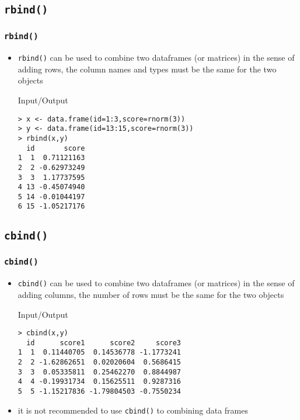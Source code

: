 \documentclass[xcolor={table},c]{beamer}
\begin{document}
\subsection{\texttt{rbind()}}
\begin{frame}[fragile]\frametitle{\texttt{rbind()}}
\begin{itemize}
\item \texttt{rbind()} can be used to combine two dataframes (or matrices) in the sense of adding rows, the column names and types must be the same for the two objects
  \begin{exampleblock}{Input/Output}\small
\begin{verbatim}
> x <- data.frame(id=1:3,score=rnorm(3))
> y <- data.frame(id=13:15,score=rnorm(3))
> rbind(x,y)
  id       score
1  1  0.71121163
2  2 -0.62973249
3  3  1.17737595
4 13 -0.45074940
5 14 -0.01044197
6 15 -1.05217176
\end{verbatim}
  \end{exampleblock}
\end{itemize}
\end{frame}

\subsection{\texttt{cbind()}}
\begin{frame}[fragile]\frametitle{\texttt{cbind()}}
\begin{itemize}
\item \texttt{cbind()} can be used to combine two dataframes (or matrices) in the sense of adding columns, the number of rows must be the same for the two objects
  \begin{exampleblock}{Input/Output}\small
\begin{verbatim}
> cbind(x,y)
  id      score1      score2     score3
1  1  0.11440705  0.14536778 -1.1773241
2  2 -1.62862651  0.02020604  0.5686415
3  3  0.05335811  0.25462270  0.8844987
4  4 -0.19931734  0.15625511  0.9287316
5  5 -1.15217836 -1.79804503 -0.7550234
\end{verbatim}
  \end{exampleblock}
\item it is not recommended to use \texttt{cbind()} to combining data frames
\end{itemize}
\end{frame}
\end{document}
